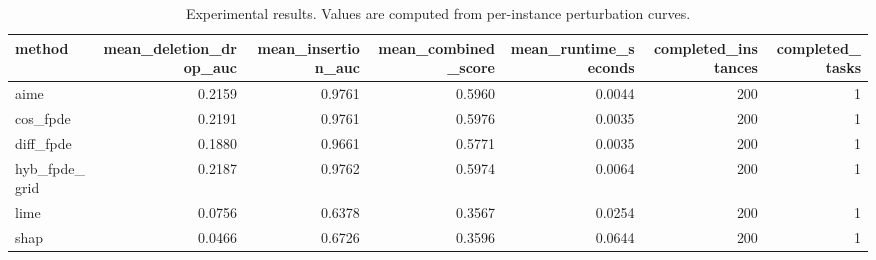 \begin{table}[t]
\caption{Experimental results. Values are computed from per-instance perturbation curves.}
\label{tab:main_results_computed}
\centering
\begin{tabular}{lrrrrrr}
\toprule
method & mean\_deletion\_drop\_auc & mean\_insertion\_auc & mean\_combined\_score & mean\_runtime\_seconds & completed\_instances & completed\_tasks \\
\midrule
aime & 0.2159 & 0.9761 & 0.5960 & 0.0044 & 200 & 1 \\
cos\_fpde & 0.2191 & 0.9761 & 0.5976 & 0.0035 & 200 & 1 \\
diff\_fpde & 0.1880 & 0.9661 & 0.5771 & 0.0035 & 200 & 1 \\
hyb\_fpde\_grid & 0.2187 & 0.9762 & 0.5974 & 0.0064 & 200 & 1 \\
lime & 0.0756 & 0.6378 & 0.3567 & 0.0254 & 200 & 1 \\
shap & 0.0466 & 0.6726 & 0.3596 & 0.0644 & 200 & 1 \\
\bottomrule
\end{tabular}

\end{table}
